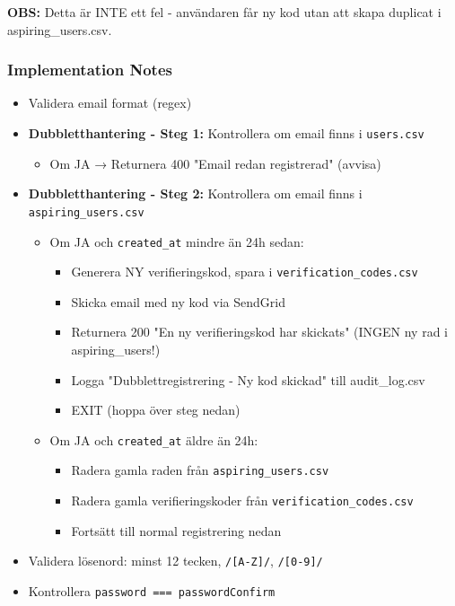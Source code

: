 \documentclass[12pt,a4paper]{article}
\begin{document}
\textbf{OBS:} Detta är INTE ett fel - användaren får ny kod utan att skapa duplicat i aspiring\_users.csv.

\subsubsection{Implementation Notes}
\begin{itemize}[noitemsep]
  \item Validera email format (regex)
  \item \textbf{Dubbletthantering - Steg 1:} Kontrollera om email finns i \texttt{users.csv}
  \begin{itemize}[noitemsep]
    \item Om JA → Returnera 400 "Email redan registrerad" (avvisa)
  \end{itemize}
  \item \textbf{Dubbletthantering - Steg 2:} Kontrollera om email finns i \texttt{aspiring\_users.csv}
  \begin{itemize}[noitemsep]
    \item Om JA och \texttt{created\_at} mindre än 24h sedan:
    \begin{itemize}[noitemsep]
      \item Generera NY verifieringskod, spara i \texttt{verification\_codes.csv}
      \item Skicka email med ny kod via SendGrid
      \item Returnera 200 "En ny verifieringskod har skickats" (INGEN ny rad i aspiring\_users!)
      \item Logga "Dubblettregistrering - Ny kod skickad" till audit\_log.csv
      \item EXIT (hoppa över steg nedan)
    \end{itemize}
    \item Om JA och \texttt{created\_at} äldre än 24h:
    \begin{itemize}[noitemsep]
      \item Radera gamla raden från \texttt{aspiring\_users.csv}
      \item Radera gamla verifieringskoder från \texttt{verification\_codes.csv}
      \item Fortsätt till normal registrering nedan
    \end{itemize}
  \end{itemize}
  \item Validera lösenord: minst 12 tecken, \texttt{/[A-Z]/}, \texttt{/[0-9]/}
  \item Kontrollera \texttt{password === passwordConfirm}

\end{itemize}
\end{document}
